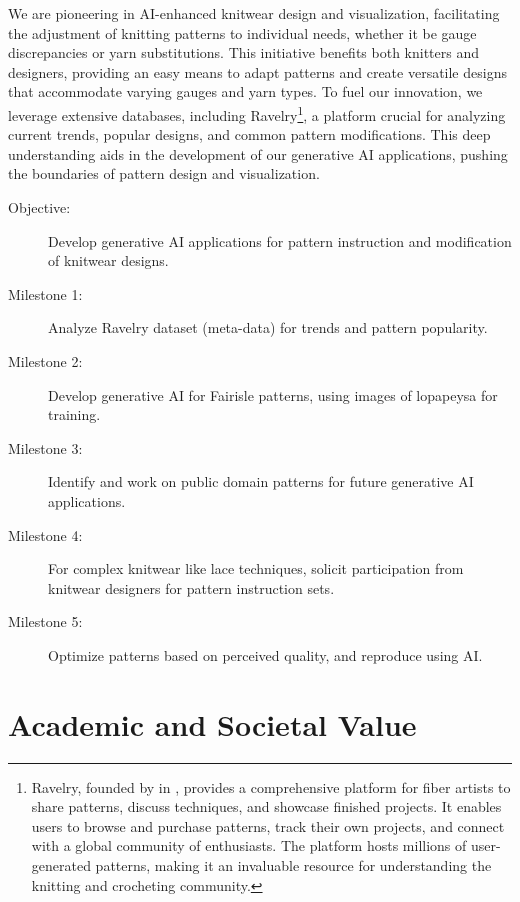 \documentclass{article}
\begin{document}
    We are pioneering in AI-enhanced knitwear design and visualization, facilitating the adjustment of knitting
    patterns to individual needs, whether it be gauge discrepancies or yarn substitutions. This initiative benefits both
    knitters and designers, providing an easy means to adapt patterns and create versatile designs that accommodate
    varying gauges and yarn types.
    To fuel our innovation, we leverage extensive databases, including Ravelry\footnote{
        Ravelry, founded by \citeauthor{Ravelry} in \citeyear{Ravelry}, provides a comprehensive platform for fiber
        artists to share patterns, discuss techniques, and showcase finished projects. It enables users to browse and
        purchase patterns, track their own projects, and connect with a global community of enthusiasts. The platform
        hosts millions of user-generated patterns, making it an invaluable resource for understanding the knitting
        and crocheting community.
    }, a platform crucial for analyzing current trends, popular designs, and common pattern modifications.
    This deep understanding aids in the development of our generative AI applications, pushing the boundaries of
    pattern design and visualization.

    \begin{description}
        \item[Objective:] Develop generative AI applications for pattern instruction and modification of
        knitwear designs.
        \item[Milestone 1:] Analyze Ravelry dataset (meta-data) for trends and pattern popularity.
        \item[Milestone 2:] Develop generative AI for Fairisle patterns, using images of lopapeysa for training.
        \item[Milestone 3:] Identify and work on public domain patterns for future generative AI applications.
        \item[Milestone 4:] For complex knitwear like lace techniques, solicit participation from knitwear designers
        for pattern instruction sets.
        \item[Milestone 5:] Optimize patterns based on perceived quality, and reproduce using AI.
    \end{description}


    \section{Academic and Societal Value}
\end{document}
